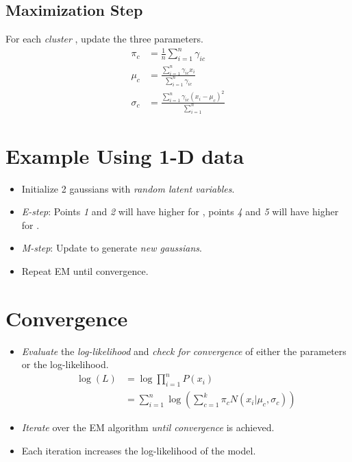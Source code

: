 \documentclass[
	number={6},
	title={Clustering}
]{cs584notes}
\begin{document}
\subsection{Maximization Step}\label{subsec:maximization-step}
For each \emph{cluster} , update the three parameters.
\begin{equation*}
\begin{aligned}
	\pi_{c} &= \frac{1}{n}\sum_{i=1}^{n} \gamma_{ic}\\
	\mu_{c} &= \frac{\sum_{i=1}^{n} \gamma_{ic} x_{i}}{\sum_{i=1}^{n} \gamma_{ic}}\\
	\sigma_{c} &= \frac{\sum_{i=1}^{n} \gamma_{ic}(x_{i} - \mu_{c})^{2}}{\sum_{i=1}^{n}}
\end{aligned}
\end{equation*}

\section{Example Using 1-D data}\label{sec:example-using-1-d-data}
\begin{itemize}
	\item Initialize 2 gaussians with \emph{random latent variables}.
	\item \emph{E-step}: Points \emph{1} and \emph{2} will have higher \data{$\gamma$} for , points \emph{4} and \emph{5} will have higher \data{$\gamma$} for .
	\item \emph{M-step}: Update \data{$\pi, \mu, \sigma$} to generate \emph{new gaussians}.
	\item Repeat EM until convergence.
\end{itemize}


\section{Convergence}\label{sec:convergence}
\begin{itemize}
	\item \emph{Evaluate} the \emph{log-likelihood} and \emph{check for convergence} of either the parameters or the log-likelihood.
	\begin{equation}
		\begin{aligned}
			\log(L) &= \log\prod_{i=1}^{n} P(x_{i})\\
					&= \sum_{i=1}^{n} \log \left( \sum_{c=1}^{k} \pi_{c} N(x_{i} | \mu_{c}, \sigma_{c}) \right)
		\end{aligned}
		\label{eq:convergence}
	\end{equation}
	\item \emph{Iterate} over the EM algorithm \emph{until convergence} is achieved.
	\item Each iteration increases the log-likelihood of the model.
\end{itemize}
\end{document}
